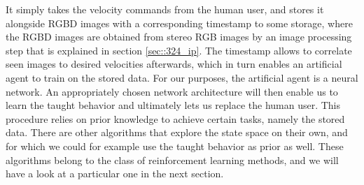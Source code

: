 It simply takes the velocity commands from the human user, and stores it alongside RGBD images with a corresponding timestamp to some storage, where the RGBD images are obtained from stereo RGB images by an image processing step that is explained in section \ref{sec::324_ip}. The timestamp allows to correlate seen images to desired velocities afterwards, which in turn enables an artificial agent to train on the stored data. For our purposes, the artificial agent is a neural network. An appropriately chosen network architecture will then enable us to learn the taught behavior and ultimately lets us replace the human user. This procedure relies on prior knowledge to achieve certain tasks, namely the stored data. There are other algorithms that explore the state space on their own, and for which we could for example use the taught behavior as prior as well. These algorithms belong to the class of reinforcement learning methods, and we will have a look at a particular one in the next section.